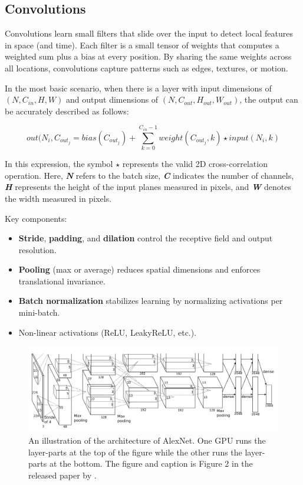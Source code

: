 \subsection{Convolutions}

Convolutions learn small filters that slide over the input to detect local features in space (and time). Each filter is a small tensor of weights that computes a weighted sum plus a bias at every position. By sharing the same weights across all locations, convolutions capture patterns such as edges, textures, or motion.  

In the most basic scenario, when there is a layer with input dimensions of \( (N, C_{in}, H, W)\) and output dimensions of \( (N, C_{out}, H_{out}, W_{out})\), the output can be accurately described as follows:

\[out(N_i, C_{out_j}=bias(C_{out_j})+\sum_{k=0}^{C_{in}-1}weight(C_{out_j},k)\star input(N_i,k)\]

In this expression, the symbol \(\star\) represents the valid 2D cross-correlation operation. Here, \textit{\textbf{N}} refers to the batch size, \textit{\textbf{C}} indicates the number of channels, \textit{\textbf{H}} represents the height of the input planes measured in pixels, and \textit{\textbf{W}} denotes the width measured in pixels. 

Key components:
\begin{itemize}
    \item \textbf{Stride}, \textbf{padding}, and \textbf{dilation} control the receptive field and output resolution.
    \item \textbf{Pooling} (max or average) reduces spatial dimensions and enforces translational invariance.
    \item \textbf{Batch normalization} stabilizes learning by normalizing activations per mini-batch.
    \item Non-linear activations (ReLU, LeakyReLU, etc.). 
\end{itemize}

\begin{figure}
    \centering
    \includegraphics[width=1\linewidth]{figures/alexnet.png}
    \caption{An illustration of the architecture of AlexNet. One GPU runs the layer-parts at the top of the figure while the other runs the layer-parts at the bottom. The figure and caption is Figure 2 in the released paper by \textcite{krizhevsky_alexnet}.}
    \label{fig:alexnet}
\end{figure}

